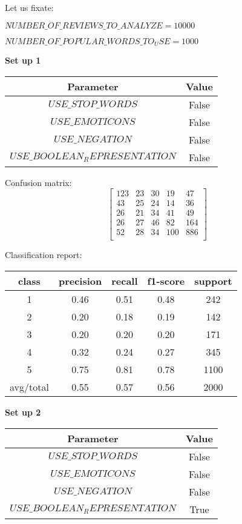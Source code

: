 \documentclass[12pt]{report}
\begin{document}
Let us fixate:

$NUMBER\_OF\_REVIEWS\_TO\_ANALYZE = 10000$

$NUMBER\_OF\_POPULAR\_WORDS\_TO_USE = 1000$

\bigbreak

\textbf{Set up 1}

\begin{center}
	\begin{tabular}{ c | c }
		\hline
		Parameter & Value \\ \hline
		$USE\_STOP\_WORDS$ & False \\ \hline
		$USE\_EMOTICONS$ & False \\ \hline
		$USE\_NEGATION$ & False \\ \hline
		$USE\_BOOLEAN_REPRESENTATION$ & False \\ \hline
	\end{tabular}
\end{center}

Confusion matrix:
\[
\begin{bmatrix}
123 & 23 & 30 & 19 & 47 \\
43 & 25 & 24 & 14 & 36 \\
26 & 21 & 34 & 41 & 49 \\
26 & 27 & 46 & 82 & 164 \\
52 & 28 & 34 & 100 & 886 \\
\end{bmatrix}
\]

Classification report:

\begin{center}
	\begin{tabular}{c | c | c | c | c }
		\hline
		class & precision & recall & f1-score & support \\ \hline
		1 & 0.46 & 0.51 & 0.48 & 242 \\ \hline
		2 & 0.20 & 0.18 & 0.19 & 142 \\ \hline
		3 & 0.20 & 0.20 & 0.20 & 171 \\ \hline
		4 & 0.32 & 0.24 & 0.27 & 345 \\ \hline
		5 & 0.75 & 0.81 & 0.78 & 1100 \\ \hline
		avg/total & 0.55 & 0.57 & 0.56 & 2000 \\ \hline
	\end{tabular}
\end{center}



\textbf{Set up 2}

\begin{center}
	\begin{tabular}{ c | c }
		\hline
		Parameter & Value \\ \hline
		$USE\_STOP\_WORDS$ & False \\ \hline
		$USE\_EMOTICONS$ & False \\ \hline
		$USE\_NEGATION$ & False \\ \hline
		$USE\_BOOLEAN_REPRESENTATION$ & True \\ \hline
	\end{tabular}
\end{center}
\end{document}
